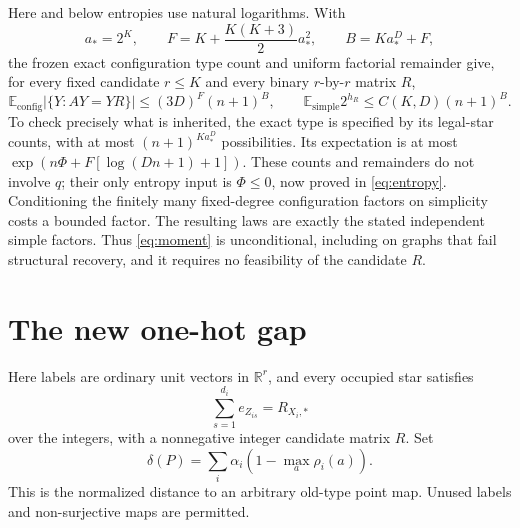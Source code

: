 \documentclass[11pt]{article}
\newcommand{\E}{\mathbb E}
\begin{document}
Here and below entropies use natural logarithms. With
\begin{equation}\label{eq:B}
 a_*=2^K,\qquad F=K+\frac{K(K+3)}2a_*^2,
 \qquad B=Ka_*^D+F,
\end{equation}
the frozen exact configuration type count and uniform factorial
remainder give, for every fixed candidate $r\le K$ and every binary
$r$-by-$r$ matrix $R$,
\begin{equation}\label{eq:moment}
 \E_{\mathrm{config}}|\{Y:AY=YR\}|
 \le (3D)^F(n+1)^B,\qquad
 \E_{\mathrm{simple}}2^{h_R}\le C(K,D)(n+1)^B.
\end{equation}
To check precisely what is inherited, the exact type is specified by
its legal-star counts, with at most $(n+1)^{Ka_*^D}$ possibilities.
Its expectation is at most
$\exp(n\Phi+F[\log(Dn+1)+1])$.
These counts and remainders do not involve $q$; their only entropy
input is $\Phi\le0$, now proved in \eqref{eq:entropy}.
Conditioning the finitely many fixed-degree configuration factors on
simplicity costs a bounded factor. The resulting laws are exactly the
stated independent simple factors. Thus \eqref{eq:moment} is
unconditional, including on graphs that fail structural recovery,
and it requires no feasibility of the candidate $R$.

\section{The new one-hot gap}
Here labels are ordinary unit vectors in $\mathbb R^r$, and every
occupied star satisfies
\[
 \sum_{s=1}^{d_i}e_{Z_{is}}=R_{X_i,*}
\]
over the integers, with a nonnegative integer candidate matrix $R$.
Set
\[
 \delta(P)=\sum_i\alpha_i(1-\max_a\rho_i(a)).
\]
This is the normalized distance to an arbitrary old-type point map.
Unused labels and non-surjective maps are permitted.
\end{document}

